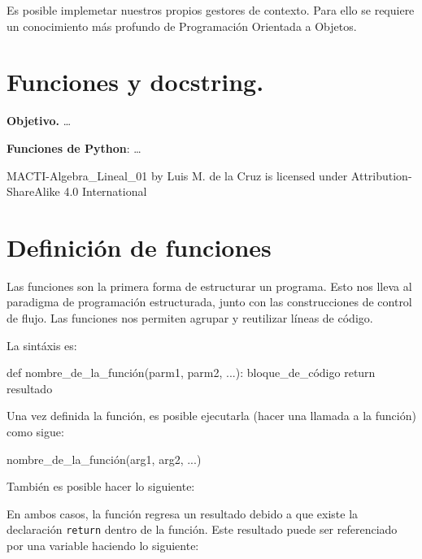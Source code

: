 \documentclass[
  letterpaper,
  DIV=11,
  numbers=noendperiod]{scrreprt}
\newenvironment{Shaded}{\begin{snugshade}}{\end{snugshade}}
\newcommand{\ControlFlowTok}[1]{\textcolor[rgb]{0.00,0.23,0.31}{#1}}
\newcommand{\KeywordTok}[1]{\textcolor[rgb]{0.00,0.23,0.31}{#1}}
\newcommand{\NormalTok}[1]{\textcolor[rgb]{0.00,0.23,0.31}{#1}}
\begin{document}
Es posible implemetar nuestros propios gestores de contexto. Para ello
se requiere un conocimiento más profundo de Programación Orientada a
Objetos.


\chapter{Funciones y docstring.}\label{funciones-y-docstring.}

\textbf{Objetivo.} \ldots{}

\textbf{Funciones de Python}: \ldots{}

MACTI-Algebra\_Lineal\_01 by Luis M. de la Cruz is licensed under
Attribution-ShareAlike 4.0 International


\chapter{Definición de funciones}\label{definiciuxf3n-de-funciones}

Las funciones son la primera forma de estructurar un programa. Esto nos
lleva al paradigma de programación estructurada, junto con las
construcciones de control de flujo. Las funciones nos permiten agrupar y
reutilizar líneas de código.

La sintáxis es:

\begin{Shaded}
\begin{Highlighting}[]
\KeywordTok{def}\NormalTok{ nombre\_de\_la\_función(parm1, parm2, ...):}
\NormalTok{    bloque\_de\_código}
    \ControlFlowTok{return}\NormalTok{ resultado}
\end{Highlighting}
\end{Shaded}

Una vez definida la función, es posible ejecutarla (hacer una llamada a
la función) como sigue:

\begin{Shaded}
\begin{Highlighting}[]
\NormalTok{nombre\_de\_la\_función(arg1, arg2, ...)}
\end{Highlighting}
\end{Shaded}

También es posible hacer lo siguiente:

En ambos casos, la función regresa un resultado debido a que existe la
declaración \texttt{return} dentro de la función. Este resultado puede
ser referenciado por una variable haciendo lo siguiente:
\end{document}
